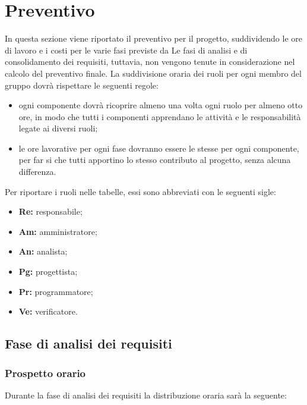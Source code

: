\section{Preventivo} \label{_preventivo}
In questa sezione viene riportato il preventivo per il progetto, suddividendo le ore di lavoro e i costi per le varie fasi previste da %
Le fasi di analisi e di consolidamento dei requisiti, tuttavia, non vengono tenute in considerazione nel calcolo del preventivo finale.
La suddivisione oraria dei ruoli per ogni membro del gruppo dovrà rispettare le seguenti regole:
		\begin{itemize}
		\item ogni componente dovrà ricoprire almeno una volta ogni ruolo per almeno otto ore, in modo che tutti i componenti apprendano le attività e le responsabilità legate ai diversi ruoli;
		\item le ore lavorative per ogni fase dovranno essere le stesse per ogni componente, per far si che tutti apportino lo stesso contributo al progetto, senza alcuna differenza.
	\end{itemize}
	 Per riportare i ruoli nelle tabelle, essi sono abbreviati con le seguenti sigle:
			\begin{itemize}
			\item\textbf{Re:} responsabile;
			\item\textbf{Am:} amministratore;
			\item\textbf{An:} analista;
			\item\textbf{Pg:} progettista;
			\item\textbf{Pr:} programmatore;
			\item\textbf{Ve:} verificatore.
		\end{itemize}
	
	\subsection{Fase di analisi dei requisiti}
		\subsubsection{Prospetto orario}
			Durante la fase di analisi dei requisiti la distribuzione oraria sarà la seguente:
			
